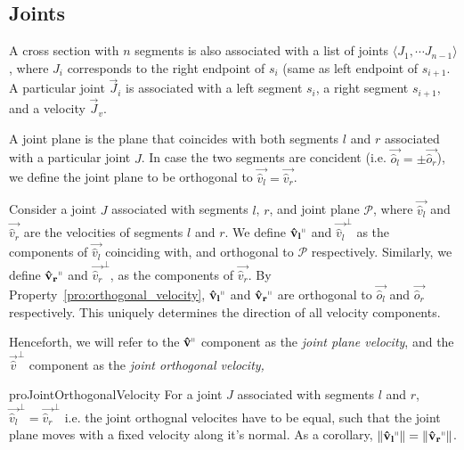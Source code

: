 \subsection{Joints}
\label{sec:joints}

\begin{definition}
\label{def:joints}
A cross section with $n$ segments is also associated with a list of joints $ \langle J_1,\cdots J_{n-1} \rangle$,
where $J_i$ corresponds to the right endpoint of $s_i$ (same as left endpoint of $s_{i+1}$.
A particular joint $\vec J_i$ is associated with a left segment $s_i$, a right segment $s_{i+1}$, and a velocity $\vec J_v$.
\end{definition}

\begin{definition}
\label{def:joint_plane}
A joint plane is the plane that coincides with both segments $l$ and $r$ associated with a particular joint $J$.
In case the two segments are concident (i.e. $\vec{\hat o_l} = \pm \vec{\hat o_r}$),
we define the joint plane to be orthogonal to $\vec{\hat v_l} = \vec{\hat v_r}$.
\end{definition}

\begin{definition}
\label{def:joint_plane_velocity}
Consider a joint $J$ associated with segments $l$, $r$, and joint plane $\mathcal P$,
where $\vec{\hat v_l}$ and $\vec{\hat v_r}$ are the velocities of segments $l$ and $r$.
We define $\vec{\hat v_l}^\shortparallel$ and $\vec{\hat v_l}^\perp$ as the components of $\vec{\hat v_l}$ coinciding with,
and orthogonal to $\mathcal P$ respectively.
Similarly, we define $\vec{\hat v_r}^\shortparallel$ and $\vec{\hat v_r}^\perp$, as the components of $\vec{\hat v_r}$.
By Property~\ref{pro:orthogonal_velocity}, $\vec{\hat v_l}^\shortparallel$ and $\vec{\hat v_r}^\shortparallel$
are orthogonal to $\vec{\hat o_l}$ and $\vec{\hat o_r}$ respectively.
This uniquely determines the direction of all velocity components.
\end{definition}

Henceforth, we will refer to the $\vec{\hat v}^\shortparallel$ component as the \emph{joint plane velocity},
and the $\vec{\hat v}^\perp$ component as the \emph{joint orthogonal velocity,}

\begin{restatable}{pro}{JointOrthogonalVelocity}
\label{pro:joint_orthogonal_velocity}
For a joint $J$ associated with segments $l$ and $r$, $\vec{\hat v_l}^\perp = \vec{\hat v_r}^\perp$
i.e. the joint orthognal velocites have to be equal, such that the joint plane moves with a fixed velocity along it's normal.
As a corollary, $ \left\| \vec{\hat v_l}^\shortparallel\right\| = \left\| \vec{\hat v_r}^\shortparallel\right\|$.
\end{restatable}
